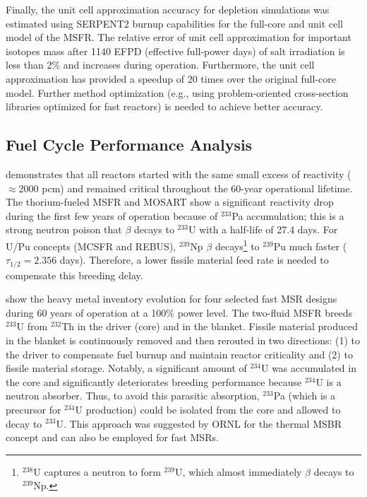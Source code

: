 \documentclass[letterpaper]{mandc2019}
\begin{document}
Finally, the unit cell approximation accuracy for depletion simulations was estimated using SERPENT2 burnup capabilities for the full-core and unit cell model of the \gls{MSFR}. 
The relative error of unit cell approximation for important isotopes mass after 1140 EFPD (effective full-power days) of salt irradiation is less than 2\% and increases during operation. 
Furthermore, the unit cell approximation has provided a speedup of 20 times over the original full-core model.
Further method optimization (e.g., using problem-oriented cross-section libraries optimized for fast reactors) is needed to achieve better accuracy.
\subsection{Fuel Cycle Performance Analysis}
 demonstrates that all reactors started with the same small excess of reactivity ($\approx$2000 pcm) and remained critical throughout the 60-year operational lifetime. 
The thorium-fueled \gls{MSFR} and \gls{MOSART} show a significant reactivity drop during the first few years of operation because of $^{233}$Pa accumulation; this is a strong neutron poison that $\beta$ decays to $^{233}$U with a half-life of 27.4 days. 
For U/Pu concepts (\gls{MCSFR} and REBUS), $^{239}$Np $\beta$ decays\footnote{$^{238}$U captures a neutron to form $^{239}$U, which almost immediately $\beta$ decays to $^{239}$Np.} to $^{239}$Pu much faster ($\tau_{1/2}=2.356$ days). 
Therefore, a lower fissile material feed rate is needed to compensate this breeding delay.

 show the heavy metal inventory evolution for four selected fast \gls{MSR} designs during 60 years of operation at a 100\% power level. 
The two-fluid \gls{MSFR} breeds $^{233}$U from $^{232}$Th in the driver (core) and in the blanket. Fissile material produced in the blanket is continuously removed and then rerouted in two directions: (1) to the driver to compensate fuel burnup and maintain reactor criticality and (2) to fissile material storage. 
Notably, a significant amount of $^{234}$U was accumulated in the core and significantly deteriorates breeding performance because $^{234}$U is a neutron absorber. 
Thus, to avoid this parasitic absorption, $^{233}$Pa (which is a precursor for $^{234}$U production) could be isolated from the core and allowed to decay to $^{233}$U. 
This approach was suggested by \gls{ORNL} for the thermal \gls{MSBR} concept \cite{robertson_conceptual_1971} and can also be employed for fast \gls{MSR}s.
\end{document}
